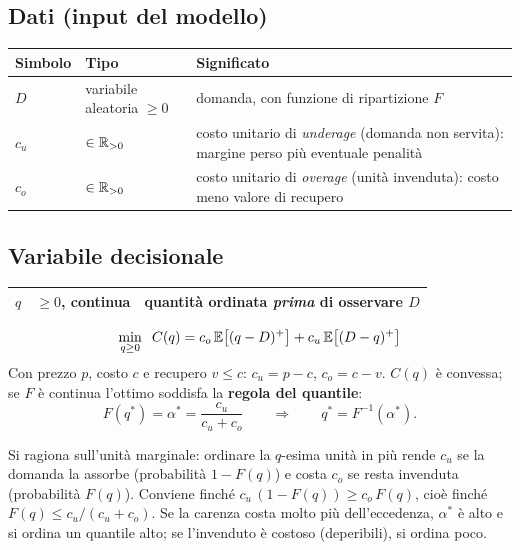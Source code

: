 \subsection*{Dati (input del modello)}
\begin{center}\small
\begin{tabular}{llp{7.2cm}}
\toprule
Simbolo & Tipo & Significato \\
\midrule
$D$ & variabile aleatoria $\ge 0$ & domanda, con funzione di ripartizione $F$ \\
$c_u$ & $\in \mathbb{R}_{> 0}$ & costo unitario di \emph{underage} (domanda non servita):
        margine perso più eventuale penalità \\
$c_o$ & $\in \mathbb{R}_{> 0}$ & costo unitario di \emph{overage} (unità invenduta):
        costo meno valore di recupero \\
\bottomrule
\end{tabular}
\end{center}

\subsection*{Variabile decisionale}
\begin{center}\small
\begin{tabular}{llp{7.2cm}}
\toprule
$q$ & $\ge 0$, continua & quantità ordinata \emph{prima} di osservare $D$ \\
\bottomrule
\end{tabular}
\end{center}

\begin{modello}
\[
\min_{q \ge 0}\;\; C(q) = c_o\, \mathbb{E}\bigl[(q - D)^+\bigr] + c_u\, \mathbb{E}\bigl[(D - q)^+\bigr]
\]
Con prezzo $p$, costo $c$ e recupero $v \le c$:\; $c_u = p - c$,\; $c_o = c - v$.
$C(q)$ è convessa; se $F$ è continua l'ottimo soddisfa la \textbf{regola del quantile}:
\[
F(q^*) = \alpha^* = \frac{c_u}{c_u + c_o}
\qquad\Longrightarrow\qquad
q^* = F^{-1}(\alpha^*).
\]
\end{modello}

\begin{spiegazione}
Si ragiona sull'unità marginale: ordinare la $q$-esima unità in più rende $c_u$ se la
domanda la assorbe (probabilità $1 - F(q)$) e costa $c_o$ se resta invenduta
(probabilità $F(q)$). Conviene finché
$c_u\,(1 - F(q)) \ge c_o\,F(q)$, cioè finché $F(q) \le c_u/(c_u + c_o)$.
Se la carenza costa molto più dell'eccedenza, $\alpha^*$ è alto e si ordina un
quantile alto; se l'invenduto è costoso (deperibili), si ordina poco.
\end{spiegazione}

